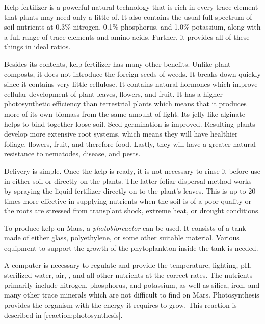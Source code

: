 Kelp fertilizer is a powerful natural technology that is rich in every trace element that plants may need only a little of. It also contains the usual full spectrum of soil nutrients at 0.3\% nitrogen, 0.1\% phosphorus, and 1.0\% potassium, along with a full range of trace elements and amino acids. Further, it provides all of these things in ideal ratios.

Besides its contents, kelp fertilizer has many other benefits. Unlike plant composts, it does not introduce the foreign seeds of weeds. It breaks down quickly since it contains very little cellulose. It contains natural hormones which improve cellular development of plant leaves, flowers, and fruit. It has a higher photosynthetic efficiency than terrestrial plants which means that it produces more of its own biomass from the same amount of light. Its jelly like alginate helps to bind together loose soil. Seed germination is improved. Resulting plants develop more extensive root systems, which means they will have healthier foliage, flowers, fruit, and therefore food. Lastly, they will have a greater natural resistance to nematodes, disease, and pests.

Delivery is simple. Once the kelp is ready, it is not necessary to rinse it before use in either soil or directly on the plants. The latter foliar dispersal method works by spraying the liquid fertilizer directly on to the plant's leaves. This is up to 20 times more effective in supplying nutrients when the soil is of a poor quality or the roots are stressed from transplant shock, extreme heat, or drought conditions.

To produce kelp on Mars, a {\it photobioreactor} can be used. It consists of a tank made of either glass, polyethylene, or some other suitable material. Various equipment to support the growth of the phytoplankton inside the tank is needed.

A computer is necessary to regulate and provide the temperature, lighting, pH, sterilized water, air, , and all other nutrients at the correct rates. The nutrients primarily include nitrogen, phosphorus, and potassium, as well as silica, iron, and many other trace minerals which are not difficult to find on Mars. Photosynthesis provides the organism with the energy it requires to grow. This reaction is described in [reaction:photosynthesis].

\startformula
{}
\stopformula

